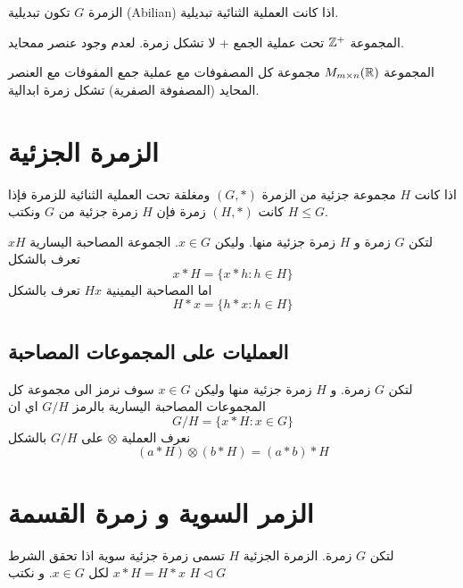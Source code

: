 \begin{definition}
	الزمرة $G$ تكون تبديلية (Abilian) اذا كانت العملية الثنائية تبديلية.
\end{definition}

\begin{example}
	المجموعة $\mathbb{Z}^+$ تحت عملية الجمع + لا تشكل زمرة. لعدم وجود عنصر ممحايد.
\end{example}

\begin{example}
	المجموعة $M_{m\times n}(\mathbb{R})$ مجموعة كل المصفوفات مع عملية جمع المفوفات مع العنصر المحايد (المصفوفة الصفرية) تشكل زمرة ابدالية.
\end{example}

\section{الزمرة الجزئية}

\begin{definition}
	اذا كانت $H$ مجموعة جزئية من الزمرة $(G, *)$ ومغلقة تحت العملية الثنائية للزمرة فإذا كانت $(H, *)$ زمرة فإن $H$ زمرة جزئية من $G$ ونكتب $H\leq G$.
\end{definition}

\begin{definition}
	لتكن $G$ زمرة و $H$ زمرة جزئية منها. وليكن $x\in G$. الجموعة المصاحبة اليسارية $xH$ تعرف بالشكل
	\[
	x*H = \{x*h : h \in H\}
	\]
	اما المصاحبة اليمينية $Hx$ تعرف بالشكل
	\[
	H*x = \{ h*x : h\in H\} 
	\]
\end{definition}

\subsection*{العمليات على المجموعات المصاحبة \cite{abstract_algebra3}}
لتكن $G$ زمرة. و $H$ زمرة جزئية منها وليكن $x\in G$ سوف نرمز الى مجموعة كل المجموعات المصاحبة اليسارية بالرمز $G/H$ اي ان 
\[
G/H = \{x*H : x\in G\}
\]
نعرف العملية $\otimes$ على $G/H$ بالشكل
\[
(a*H)\otimes(b*H) = (a*b)*H
\]

\section{الزمر السوية و زمرة القسمة}

\begin{definition}
	لتكن $G$ زمرة. الزمرة الجزئية $H$ تسمى زمرة جزئية سوية اذا تحقق الشرط $x * H = H * x$ لكل $x\in G$. و نكتب $H \triangleleft G$
\end{definition}

